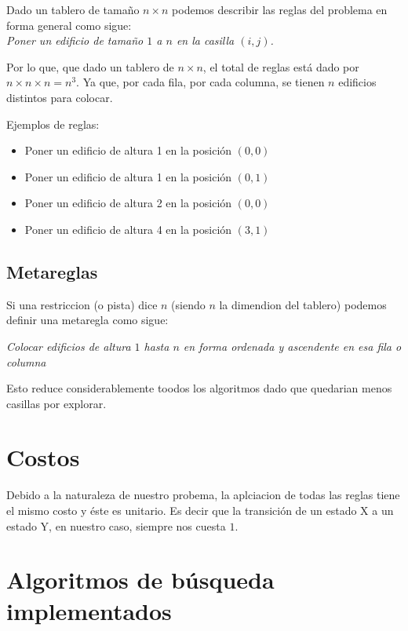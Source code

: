 \documentclass[%
	final,
	reprint,
	notitlepage,
	narroweqnarray,
	inline,
	twoside,
	invited
	]{ieee}
\begin{document}
\par Dado un tablero de tamaño $n\times n$ podemos describir las reglas del problema en forma general como sigue:\\

\emph{Poner un edificio de tamaño $1$ a $n$ en la casilla $(i,j)$.}\\

\par Por lo que, que dado un tablero de $n\times n$, el total de reglas está dado por $n \times {n \times n} = n^3$. Ya que, por cada fila, por cada columna, se tienen $n$ edificios distintos para colocar. 
\par Ejemplos de reglas:
\begin{itemize}
\item Poner un edificio de altura 1 en la posición $(0,0)$
\item Poner un edificio de altura 1 en la posición $(0,1)$
\item Poner un edificio de altura 2 en la posición $(0,0)$
\item Poner un edificio de altura 4 en la posición $(3,1)$
\end{itemize}

\subsection{Metareglas}

\par Si una restriccion (o pista) dice $n$ (siendo $n$ la dimendion del tablero) podemos definir una metaregla como sigue:

\emph{Colocar edificios de altura $1$ hasta $n$ en forma ordenada y ascendente en esa fila o columna}

\par Esto reduce considerablemente toodos los algoritmos dado que quedarian menos casillas por explorar.

\section{Costos}

\par Debido a la naturaleza de nuestro probema, la aplciacion de todas las reglas tiene el mismo costo y éste es unitario. Es decir que la transición de un estado X a un estado Y, en nuestro caso, siempre nos cuesta $1$.

\section{Algoritmos de búsqueda implementados}
\end{document}
